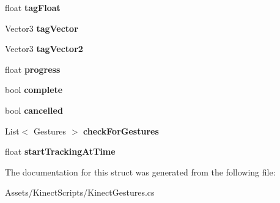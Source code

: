 \begin{DoxyCompactItemize}
float {\bfseries tag\+Float}
\item 
\mbox{\label{struct_kinect_gestures_1_1_gesture_data_a934e1ed945b1b20c731b25bc164e6926}} 
Vector3 {\bfseries tag\+Vector}
\item 
\mbox{\label{struct_kinect_gestures_1_1_gesture_data_aba4db03fef47f5306304c1afbf219c19}} 
Vector3 {\bfseries tag\+Vector2}
\item 
\mbox{\label{struct_kinect_gestures_1_1_gesture_data_ae64ae7e44edad3e1e847d5925420e398}} 
float {\bfseries progress}
\item 
\mbox{\label{struct_kinect_gestures_1_1_gesture_data_a0b074cbc71e98749d5598b704793dd0e}} 
bool {\bfseries complete}
\item 
\mbox{\label{struct_kinect_gestures_1_1_gesture_data_ae0f3a74a6a3d3153777b63154eb943e1}} 
bool {\bfseries cancelled}
\item 
\mbox{\label{struct_kinect_gestures_1_1_gesture_data_a08fa67c179b32654403e2e8a9247e290}} 
List$<$ Gestures $>$ {\bfseries check\+For\+Gestures}
\item 
\mbox{\label{struct_kinect_gestures_1_1_gesture_data_a108cda0a71bed75455eef681344db6c4}} 
float {\bfseries start\+Tracking\+At\+Time}
\end{DoxyCompactItemize}


The documentation for this struct was generated from the following file\+:\begin{DoxyCompactItemize}
\item 
Assets/\+Kinect\+Scripts/Kinect\+Gestures.\+cs\end{DoxyCompactItemize}
